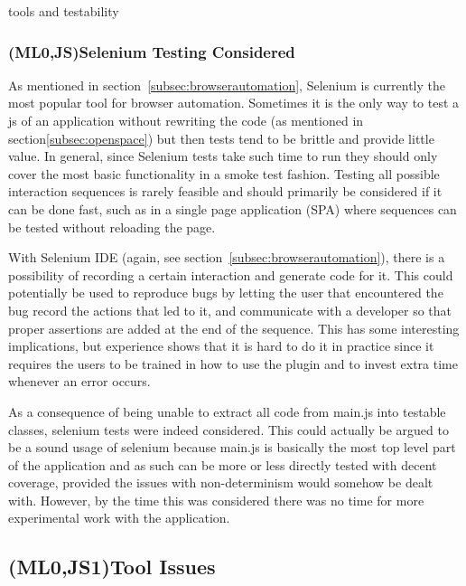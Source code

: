 \documentclass[11pt]{article}
\begin{document}
tools and testability

\subsubsection{(ML0,JS)Selenium Testing Considered}
\label{subsec:asteroids}

As mentioned in section~\ref{subsec:browserautomation}, Selenium is currently the most popular tool for browser automation. Sometimes it is the only way to test a \gls{js} of an application without rewriting the code\cite[question~43]{Stenmark} (as mentioned in section\ref{subsec:openspace}) but then tests tend to be brittle and provide little value. In general, since Selenium tests take such time to run they should only cover the most basic functionality in a smoke test fashion. \cite[questions~16-17]{Stenmark}\cite[question~21]{Ahnve} Testing all possible interaction sequences is rarely feasible and should primarily be considered if it can be done fast, such as in a single page application (SPA) where sequences can be tested without reloading the page. \cite[question~44]{Edelstam}

With Selenium IDE (again, see section~\ref{subsec:browserautomation}), there is a possibility of recording a certain interaction and generate code for it. This could potentially be used to reproduce bugs by letting the user that encountered the bug record the actions that led to it, and communicate with a developer so that proper assertions are added at the end of the sequence. This has some interesting implications, but experience shows that it is hard to do it in practice since it requires the users to be trained in how to use the plugin and to invest extra time whenever an error occurs. \cite[questions~42-43]{Edelstam}

As a consequence of being unable to extract all code from main.js into testable classes, selenium tests were indeed considered. This could actually be argued to be a sound usage of selenium because main.js is basically the most top level part of the application and as such can be more or less directly tested with decent coverage, provided the issues with non-determinism would somehow be dealt with. However, by the time this was considered there was no time for more experimental work with the application.

\subsection{(ML0,JS1)Tool Issues}
\end{document}
